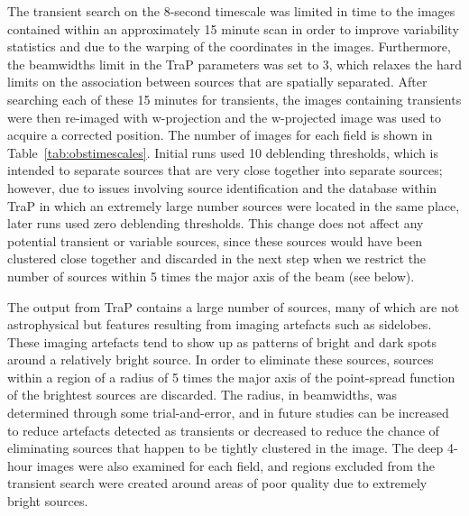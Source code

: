 \documentclass[12pt]{article}
\begin{document}
The transient search on the 8-second timescale was limited in time to the images contained within an approximately 15 minute scan in order to improve variability statistics and due to the warping of the coordinates in the images. Furthermore, the beamwidths limit in the TraP parameters was set to 3, which relaxes the hard limits on the association between sources that are spatially separated. After searching each of these 15 minutes for transients, the images containing transients were then re-imaged with w-projection and the w-projected image was used to acquire a corrected position. The number of images for each field is shown in Table~\ref{tab:obstimescales}. Initial runs used 10 deblending thresholds, which is intended to separate sources that are very close together into separate sources; however, due to issues involving source identification and the database within TraP in which an extremely large number sources were located in the same place, later runs used zero deblending thresholds. This change does not affect any potential transient or variable sources, since these sources would have been clustered close together and discarded in the next step when we restrict the number of sources within 5 times the major axis of the beam (see below).

The output from TraP contains a large number of sources, many of which are not astrophysical but features resulting from imaging artefacts such as sidelobes. These imaging artefacts tend to show up as patterns of bright and dark spots around a relatively bright source. In order to eliminate these sources, sources within a region of a radius of 5 times the major axis of the point-spread function of the brightest sources are discarded. The radius, in beamwidths, was determined through some trial-and-error, and in future studies can be increased to reduce artefacts detected as transients or decreased to reduce the chance of eliminating sources that happen to be tightly clustered in the image. The deep 4-hour images were also examined for each field, and regions excluded from the transient search were created around areas of poor quality due to extremely bright sources. 
\end{document}
